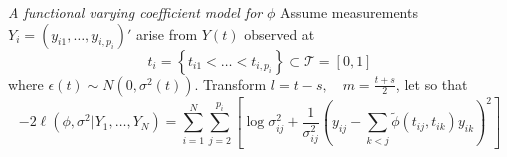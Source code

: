 \begin{frame}{\textit{A functional varying coefficient model for} $\phi$ }%
\footnotesize
Assume measurements $Y_i = \left(y_{i1}, \dots, y_{i,p_i}\right)'$ arise from $Y\left(t\right)$ observed at 
\[
t_{i} = \left\{t_{i1} <  \dots < t_{i,p_i}\right\} \subset \mathcal{T} = \left[0,1\right]
\]
where $\epsilon\left(t\right) \sim N\left(0,\sigma^2\left(t\right)\right)$. Transform $l = t - s, \quad m = \frac{t + s}{2}$, let
so that \footnotesize
\begin{equation*} \label{eq:full-joint-likelihood}
-2\ell\left(\phi, \sigma^2 \vert Y_1,\dots, Y_N \right) = \sum_{i=1}^N \sum_{j=2}^{p_i} \left[ \log \sigma_{ij}^2+ \frac{1}{\sigma^{2}_{ij}}\left( y_{ij} - \sum_{k<j} \tilde{\phi}\left(t_{ij}, t_{ik}\right) y_{ik}  \right)^2\right]
\end{equation*}
\end{frame}




